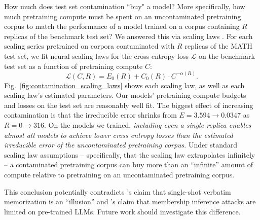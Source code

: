 How much does test set contamination ``buy" a model? 
More specifically, how much pretraining compute must be spent on an uncontaminated pretraining corpus to match the performance of a model trained on a corpus containing $R$ replicas of the benchmark test set?
We answered this via scaling laws \citep{kaplan2020scaling, hoffman2022chinchilla, openai2024gpt4technicalreport, hu2024predictingemergentabilitiesinfinite, schaeffer2025pretrainingscalinglawsgenerative}. For each scaling series pretrained on corpora contaminated with $R$ replicas of the MATH test set, we fit neural scaling laws for the cross entropy loss $\mathcal{L}$ on the benchmark test set as a function of pretraining compute $C$:
%
\begin{equation}
    \label{eqn:neural_scaling_law}
    \mathcal{L}(C, R) = E_0(R) + C_0(R) \cdot C^{-\alpha(R)}.
\end{equation}
%
%
Fig.~\ref{fig:contamination_scaling_laws} shows each scaling law, as well as each scaling law's estimated parameters.
Our models' pretraining compute budgets and losses on the test set are reasonably well fit.
The biggest effect of increasing contamination is that the irreducible error shrinks from $E = 3.594 \rightarrow 0.0347$ as $R=0 \rightarrow 316$.
On the models we trained, \emph{including even a single replica enables almost all models to achieve lower cross entropy losses than the estimated irreducible error of the uncontaminated pretraining corpus}.
Under standard scaling law assumptions -- specifically, that the scaling law extrapolates infinitely -- a contaminated pretraining corpus can buy more than an ``infinite'' amount of compute relative to pretraining on an uncontaminated pretraining corpus.

This conclusion potentially contradicts \citet{huang2024demystifying}'s claim that single-shot verbatim memorization is an ``illusion''  and \citet{hayes2025exploring}'s claim that membership inference attacks are limited on pre-trained LLMs.
Future work should investigate this difference.

